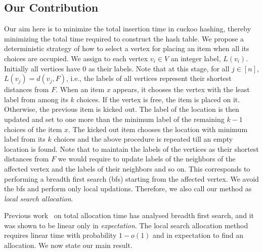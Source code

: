 \subsection{Our Contribution}
Our aim here is to minimize the total insertion time in cuckoo hashing, thereby minimizing the total time required to construct the hash table. We propose a deterministic strategy of how to select a vertex for placing an item when all its choices are occupied.
We assign to each vertex $v_i\in V$ an integer label, $L(v_i)$. Initially all vertices have $0$ as their labels. Note that at this stage, for all  $j\in [n]$, $L(v_j) =d(v_j,F)$, i.e., the labels of all vertices represent their shortest distances from $F$. When an item $x$ appears, it chooses the vertex with the least label from among its $k$ choices. If the vertex is free, the item is placed on it. Otherwise, the previous item is kicked out. The label of the location is then updated and set to one more than the minimum label of the remaining $k-1$ choices of the item $x$. The kicked out item chooses the location with minimum label from its $k$ choices and the above procedure is repeated till an empty location is found. 
Note that to maintain the labels of the vertices as their shortest distances from $F$ we would require to update labels of the neighbors of the affected vertex and the labels of their neighbors and so on. This corresponds to performing a breadth first search (bfs) starting from the affected vertex. We avoid the bfs and perform only local updations. Therefore, we also call our method as \emph{local search allocation}. 

Previous work~\cite{inc:fpss03} on total allocation time has analysed breadth first search, and it was shown  to be linear only in \emph{expectation}.  The local search allocation method requires linear time with probability $1-o(1)$  and in expectation to find an allocation. We now state our main result.

